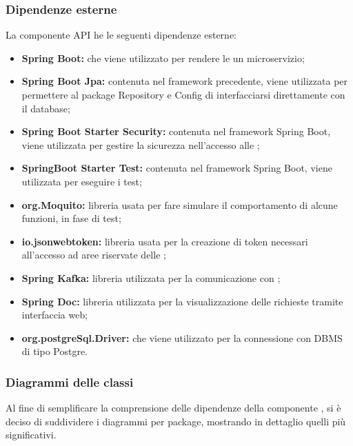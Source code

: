 	\subsubsection{Dipendenze esterne}
		La componente API he le seguenti dipendenze esterne:
		\begin{itemize}
			\item \textbf{Spring Boot:} che viene utilizzato per rendere le  un microservizio; 
			\item \textbf{Spring Boot Jpa:} contenuta nel framework precedente, viene utilizzata per permettere al package Repository e Config di interfacciarsi direttamente con il database;
			\item \textbf{Spring Boot Starter Security:} contenuta nel framework Spring Boot, viene utilizzata per gestire la sicurezza nell'accesso alle ;
			\item \textbf{SpringBoot Starter Test:} contenuta nel framework Spring Boot, viene utilizzata per eseguire i test;
			\item \textbf{org.Moquito:} libreria usata per fare simulare il comportamento di alcune funzioni, in fase di test;
			\item \textbf{io.jsonwebtoken:} libreria usata per la creazione di token necessari all'accesso ad aree riservate delle ;
			\item \textbf{Spring Kafka:} libreria utilizzata per la comunicazione con ;
			\item \textbf{Spring Doc:} libreria utilizzata per la visualizzazione delle richieste  tramite interfaccia web;
			\item \textbf{org.postgreSql.Driver:} che viene utilizzato per la connessione con DBMS di tipo Postgre.
		\end{itemize}

	\subsubsection{Diagrammi delle classi}
		Al fine di semplificare la comprensione delle dipendenze della componente , si è deciso di suddividere i diagrammi per package, mostrando in dettaglio quelli più significativi.
		\newpage
